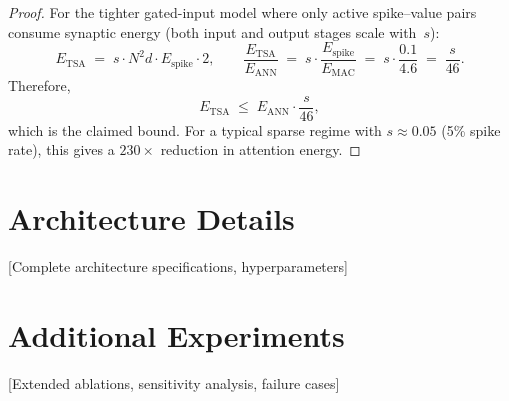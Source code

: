 \documentclass{article}
\begin{document}
\begin{proof}
For the tighter gated-input model where only active spike--value pairs
consume synaptic energy (both input and output stages scale with~$s$):
\[
  E_{\mathrm{TSA}} \;=\; s \cdot N^2 d \cdot E_{\mathrm{spike}} \cdot 2,
  \qquad
  \frac{E_{\mathrm{TSA}}}{E_{\mathrm{ANN}}}
  \;=\; s \cdot \frac{E_{\mathrm{spike}}}{E_{\mathrm{MAC}}}
  \;=\; s \cdot \frac{0.1}{4.6}
  \;=\; \frac{s}{46}.
\]
Therefore,
\[
  E_{\mathrm{TSA}} \;\le\; E_{\mathrm{ANN}} \cdot \frac{s}{46},
\]
which is the claimed bound.  For a typical sparse regime with
$s \approx 0.05$ (5\% spike rate), this gives a $230\times$ reduction
in attention energy.
\end{proof}

\section{Architecture Details}
\label{app:architecture}

[Complete architecture specifications, hyperparameters]

\section{Additional Experiments}
\label{app:additional}

[Extended ablations, sensitivity analysis, failure cases]
\end{document}
